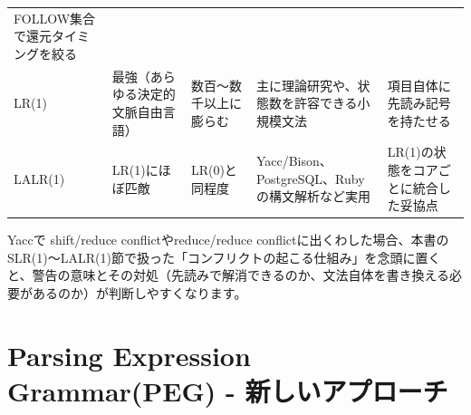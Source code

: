 \begin{longtable}[]{@{}lllll@{}}
\begin{minipage}[t]{0.17\columnwidth}
FOLLOW集合で還元タイミングを絞る\strut
\end{minipage}\tabularnewline
\begin{minipage}[t]{0.17\columnwidth}\raggedright
LR(1)\strut
\end{minipage} & \begin{minipage}[t]{0.17\columnwidth}\raggedright
最強（あらゆる決定的文脈自由言語）\strut
\end{minipage} & \begin{minipage}[t]{0.17\columnwidth}\raggedright
数百〜数千以上に膨らむ\strut
\end{minipage} & \begin{minipage}[t]{0.17\columnwidth}\raggedright
主に理論研究や、状態数を許容できる小規模文法\strut
\end{minipage} & \begin{minipage}[t]{0.17\columnwidth}\raggedright
項目自体に先読み記号を持たせる\strut
\end{minipage}\tabularnewline
\begin{minipage}[t]{0.17\columnwidth}\raggedright
LALR(1)\strut
\end{minipage} & \begin{minipage}[t]{0.17\columnwidth}\raggedright
LR(1)にほぼ匹敵\strut
\end{minipage} & \begin{minipage}[t]{0.17\columnwidth}\raggedright
LR(0)と同程度\strut
\end{minipage} & \begin{minipage}[t]{0.17\columnwidth}\raggedright
Yacc/Bison、PostgreSQL、Rubyの構文解析など実用\strut
\end{minipage} & \begin{minipage}[t]{0.17\columnwidth}\raggedright
LR(1)の状態をコアごとに統合した妥協点\strut
\end{minipage}\tabularnewline
\bottomrule
\end{longtable}

Yaccで shift/reduce conflictやreduce/reduce
conflictに出くわした場合、本書のSLR(1)〜LALR(1)節で扱った「コンフリクトの起こる仕組み」を念頭に置くと、警告の意味とその対処（先読みで解消できるのか、文法自体を書き換える必要があるのか）が判断しやすくなります。

\hypertarget{chapter5-parsing-expression-grammarpeg---ux65b0ux3057ux3044ux30a2ux30d7ux30edux30fcux30c1}{%
\section{Parsing Expression Grammar(PEG) -
新しいアプローチ}\label{chapter5-parsing-expression-grammarpeg---ux65b0ux3057ux3044ux30a2ux30d7ux30edux30fcux30c1}}

